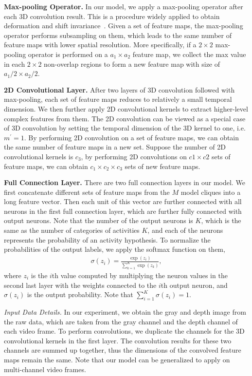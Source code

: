 \documentclass{sig-alternate}
\begin{document}
\textbf{Max-pooling Operator.} In our model, we apply a max-pooling operator after each 3D convolution result. This is a procedure widely applied to obtain deformation and shift invariance~\cite{ImagenetNIPS2012,KaiYuSC}. Given a set of feature maps, the max-pooling operator performs subsampling on them, which leads to the same number of feature maps with lower spatial resolution. More specifically, if a $2 \times 2$ max-pooling operator is performed on a $a_1 \times a_2$ feature map, we collect the max value in each $2 \times 2$ non-overlap regions to form a new feature map with size of $a_1 / 2 \times a_2 / 2$.



\textbf{2D Convolutional Layer.} After two layers of 3D convolution followed with max-pooling, each set of feature maps reduces to relatively a small temporal dimension. We then further apply 2D convolutional kernels to extract higher-level complex features from them. The 2D convolution can be viewed as a special case of 3D convolution by setting the temporal dimension of the 3D kernel to one, i.e. $m^{\prime}  = 1$. By performing 2D convolution on a set of feature maps, we can obtain the same number of feature maps in a new set. Suppose the number of 2D convolutional kernels is $c_3$, by performing 2D convolutions on $c1 \times c2 $ sets of feature maps, we can obtain $c_1 \times c_2 \times c_3$ sets of new feature maps.


\textbf{Full Connection Layer.} There are two full connection layers in our model. We first concatenate different sets of feature maps from the $M$ model cliques into a long feature vector. Then each unit of this vector are further connected with all neurons in the first full connection layer, which are further fully connected with output neurons. Note that the number of the output neurons is $K$, which is the same as the number of categories of activities $K$, and each of the neurons represents the probability of an activity hypothesis. To normalize the probabilities of the output labels, we apply the softmax function on them,
\begin{eqnarray} \label{eq:softmax}
\sigma(z_i) = \frac{\exp{(z_i)}}{\sum_{k=1}^K \exp{(z_k)}},
\end{eqnarray}
where $z_i$ is the $i$th value computed by multiplying the neuron values in the second last layer with the weights connected to the $i$th output neuron, and $\sigma(z_i)$ is the output probability. Note that $\sum_{i=1}^K \sigma(z_i) = 1$.


\emph{Input Data Details.} In our experiment, we obtain the gray and depth image from the raw data, which are taken from the gray channel and the depth channel of each video frame. To perform convolutions, we duplicate the channels for the 3D convolutional kernels in the first layer. The convolution results for these two channels are summed up together, thus the dimensions of the convolved feature maps remain the same. Note that our model can be generalized to apply on multi-channel video frames.
\end{document}
